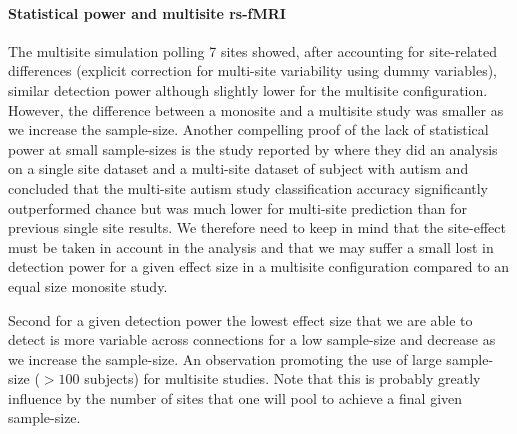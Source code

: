 \documentclass[authoryear]{elsarticle}
\begin{document}
\paragraph{Statistical power and multisite rs-fMRI} The multisite simulation polling 7 sites showed, after accounting for site-related differences (explicit correction for multi-site variability using dummy variables), similar detection power although slightly lower for the multisite configuration. However, the difference between a monosite and a multisite study was smaller as we increase the sample-size. Another compelling proof of the lack of statistical power at small sample-sizes is the study reported by \cite{Nielsen2013} where they did an analysis on a single site dataset and a multi-site dataset of subject with autism and concluded that the multi-site autism study classification accuracy significantly outperformed chance but was much lower for multi-site prediction than for previous single site results. We therefore need to keep in mind that the site-effect must be taken in account in the analysis and that we may suffer a small lost in detection power for a given effect size in a multisite configuration compared to an equal size monosite study.\\
\par
Second for a given detection power the lowest effect size that we are able to detect is more variable across connections for a low sample-size and decrease as we increase the sample-size.  
An observation promoting the use of large sample-size ($>100$ subjects) for multisite studies. Note that this is probably greatly influence by the number of sites that one will pool to achieve a final given sample-size. 


\end{document}
